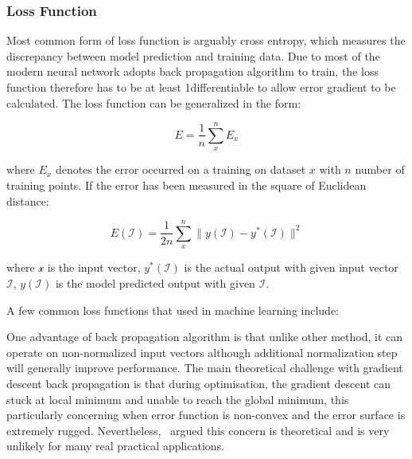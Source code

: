 \subsubsection{Loss Function}

Most common form of loss function is arguably cross entropy, which measures the discrepancy between model prediction and training data. Due to most of the modern neural network adopts back propagation algorithm to train, the loss function therefore has to be at least 1\textdegree differentiable to allow error gradient to be calculated. The loss function can be generalized in the form:

\begin{equation}
    E = \frac {1}{n} \sum_x^n E_x
\end{equation}

where $E_x$ denotes the error occurred on a training on dataset $x$ with $n$ number of training points. If the error has been measured in the square of Euclidean distance:

\begin{equation}
    E(\mathcal{I}) = \frac {1}{2n} \sum_x^n \parallel y(\mathcal{I}) - y^*(\mathcal{I}) \parallel^2 
\end{equation}

where $\mathcal{x}$ is the input vector, $y^*(\mathcal{I})$ is the actual output with given input vector $\mathcal{I}$, $y(\mathcal{I})$ is the model predicted output with given $\mathcal{I}$. 
\par 
A few common loss functions that used in machine learning include:

\begin{enumerate}
    \item Mean Squared Error (MSE) \\
MSE has the form:
\begin{equation}
\end{

\end{enumerate}

\par 
One advantage of back propagation algorithm is that unlike other method, it can operate on non-normalized input vectors although additional normalization step will generally improve performance. \cite{Buckland:2002} The main theoretical challenge with gradient descent back propagation is that during optimisation, the gradient descent can stuck at local minimum and unable to reach the global minimum, this particularly concerning when error function is non-convex and the error surface is extremely rugged. Nevertheless,~\citet{LeCun_2015} argued this concern is theoretical and is very unlikely for many real practical applications. 